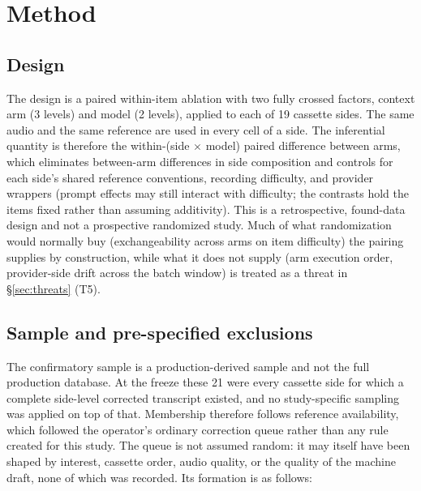 \documentclass[11pt]{article}
\begin{document}
\section{Method}
\label{sec:method}

\subsection{Design}

The design is a paired within-item ablation with two fully crossed factors, context arm (3 levels) and model (2 levels), applied to each of 19 cassette sides. The same audio and the same reference are used in every cell of a side. The inferential quantity is therefore the within-(side $\times$ model) paired difference between arms, which eliminates between-arm differences in side composition and controls for each side's shared reference conventions, recording difficulty, and provider wrappers (prompt effects may still interact with difficulty; the contrasts hold the items fixed rather than assuming additivity). This is a retrospective, found-data design and not a prospective randomized study. Much of what randomization would normally buy (exchangeability across arms on item difficulty) the pairing supplies by construction, while what it does not supply (arm execution order, provider-side drift across the batch window) is treated as a threat in \S\ref{sec:threats} (T5).

\subsection{Sample and pre-specified exclusions}
\label{sec:sample}

The confirmatory sample is a production-derived sample and not the full production database. At the freeze these 21 were every cassette side for which a complete side-level corrected transcript existed, and no study-specific sampling was applied on top of that. Membership therefore follows reference availability, which followed the operator's ordinary correction queue rather than any rule created for this study. The queue is not assumed random: it may itself have been shaped by interest, cassette order, audio quality, or the quality of the machine draft, none of which was recorded. Its formation is as follows:
\end{document}
